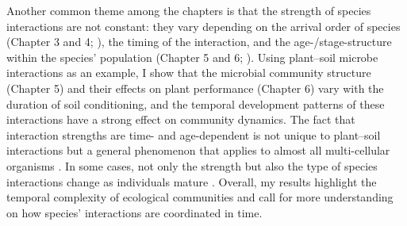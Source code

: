 Another common theme among the chapters is that the strength of species interactions are not constant: they vary depending on the arrival order of species (Chapter 3 and 4; \citealp{Fukami2015, Duhamel2019}), the timing of the interaction, and the age-/stage-structure within the species' population (Chapter 5 and 6; \citealp{Kardol2013Oikos, Peay2018}). Using plant--soil microbe interactions as an example, I show that the microbial community structure (Chapter 5) and their effects on plant performance (Chapter 6) vary with the duration of soil conditioning, and the temporal development patterns of these interactions have a strong effect on community dynamics. The fact that interaction strengths are time- and age-dependent is not unique to plant--soil interactions but a general phenomenon that applies to almost all multi-cellular organisms \citep{Miller2011, deRoos2013, Nakazawa2015}. In some cases, not only the strength but also the type of species interactions change as individuals mature \citep{Yang2010, KeNakazawa2018}. Overall, my results highlight the temporal complexity of ecological communities and call for more understanding on how species' interactions are coordinated in time.
\par


